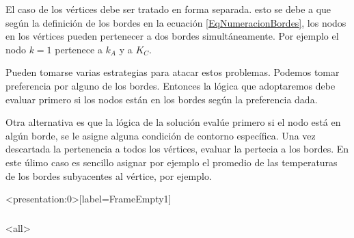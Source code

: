 
El caso de los vértices debe ser tratado en forma separada. 
esto se debe a que según la definición de los bordes en 
la ecuación \ref{EqNumeracionBordes}, los nodos en los 
vértices pueden pertenecer a dos bordes simultáneamente.
Por ejemplo el nodo $k=1$ pertenece a $k_A$ y a $K_C$. 

Pueden tomarse varias estrategias para atacar estos 
problemas. Podemos tomar preferencia por alguno de 
los bordes. Entonces la lógica que adoptaremos 
debe evaluar primero si los nodos están en los
bordes según la preferencia dada. 

Otra alternativa es que la lógica de la solución 
evalúe primero si el nodo está en algún borde, se 
le asigne alguna condición de contorno específica.
Una vez descartada la pertenencia a todos los vértices,
evaluar la pertecia a los bordes. 
En este úlimo caso es sencillo asignar por ejemplo
el promedio de las temperaturas de los bordes 
subyacentes al vértice, por ejemplo.

\mode*
\begin{frame}<presentation:0>[label=FrameEmpty1]
  \frametitle{}
\end{frame}
\mode<all>
